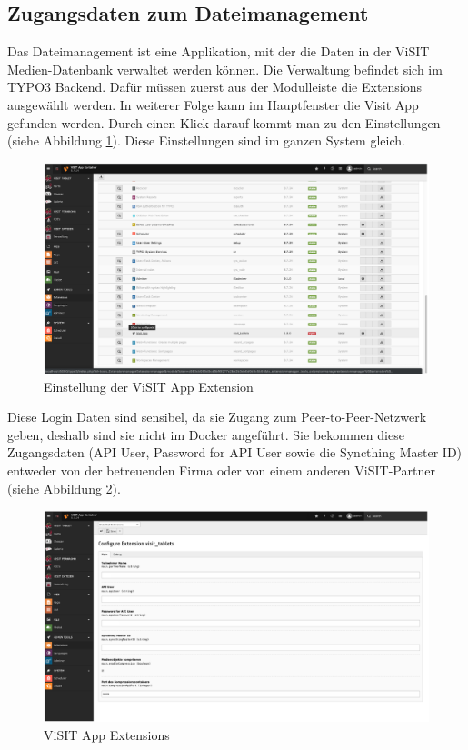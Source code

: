 \subsection{Zugangsdaten zum Dateimanagement}

Das Dateimanagement ist eine Applikation, mit der die Daten in der ViSIT Medien-Datenbank verwaltet werden können. Die Verwaltung befindet sich im TYPO3 Backend. Dafür müssen zuerst aus der Modulleiste die Extensions ausgewählt werden. In weiterer Folge kann im Hauptfenster die Visit App gefunden werden. Durch einen Klick darauf kommt man zu den Einstellungen (siehe Abbildung \ref{img:einstellung_extension}). Diese Einstellungen sind im ganzen System gleich.

\begin{figure}[ht!]
\centering
\includegraphics[width=12cm]{Figures/paula/dateiverwaltung/einstellung_extension.png}
\caption{Einstellung der ViSIT App Extension}
\label{img:einstellung_extension}
\end{figure}

Diese Login Daten sind sensibel, da sie Zugang zum Peer-to-Peer-Netzwerk geben, deshalb sind sie nicht im Docker angeführt. Sie bekommen diese Zugangsdaten (API User, Password for API User sowie die Syncthing Master ID) entweder von der betreuenden Firma oder von einem anderen ViSIT-Partner (siehe Abbildung \ref{img:extensions}).\\

\begin{figure}[ht!]
\centering
\includegraphics[width=12cm]{Figures/paula/dateiverwaltung/extensions.png}
\caption{ViSIT App Extensions}
\label{img:extensions}
\end{figure}

